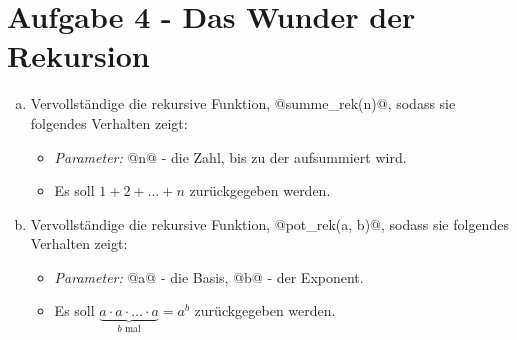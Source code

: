     \section*{Aufgabe 4 - Das Wunder der Rekursion}
    \begin{enumerate}[a)]
        \item 
        Vervollständige die rekursive Funktion, @summe_rek(n)@, sodass sie folgendes Verhalten zeigt:
        \begin{itemize}
            \item 
            \textit{Parameter:} @n@ - die Zahl, bis zu der aufsummiert wird.
            \item 
            Es soll $1 + 2 + \dots + n$ zurückgegeben werden.
        \end{itemize}

        \item 
        Vervollständige die rekursive Funktion, @pot_rek(a, b)@, sodass sie folgendes Verhalten zeigt:
        \begin{itemize}
            \item 
            \textit{Parameter:} @a@ - die Basis, @b@ - der Exponent.
            \item 
            Es soll $\underbrace{a \cdot a \cdot \dots \cdot a}_{b\text{ mal}}=a^b$ zurückgegeben werden.
        \end{itemize}
    \end{enumerate}

